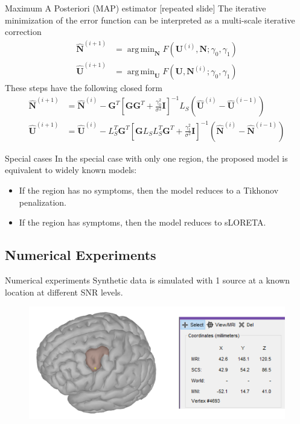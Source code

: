 \documentclass[progressbar=head]{beamer}
\newcommand{\ppar}[1]{ \left( #1 \right) }
\newcommand{\spar}[1]{ \left[ #1 \right] }
\DeclareMathOperator*{\argmin}{arg\,min}
\newcommand{\G}{\mathbf{G}}
\newcommand{\U}{\mathbf{U}}
\newcommand{\N}{\mathbf{N}}
\newcommand{\id}{\mathbf{I}}
\begin{document}
\begin{frame}{Maximum A Posteriori (MAP) estimator [repeated slide]}
    The iterative minimization of the error function can be interpreted as a multi-scale iterative correction
    \begin{align}
        \hat{\N}^{(i+1)} &= \argmin_{\N} F\ppar{\U^{(i)},\N; \gamma_0, \gamma_1}
        \\
        \hat{\U}^{(i+1)} &= \argmin_{\U} F\ppar{\U,\N^{(i)}; \gamma_0, \gamma_1}
    \end{align}
    These steps have the following closed form
    \begin{align}
        \hat{\N}^{(i+1)} &=
        \hat{\N}^{(i)}
        -
        \G^T \spar{\G \G^T + \frac{\gamma_0^2}{\sigma^2} \id}^{-1} L_S \ppar{\hat{\U}^{(i)}-\hat{\U}^{(i-1)} }
        \\
        \hat{\U}^{(i+1)} &=
        \hat{\U}^{(i)}
        -
        L_S^T \G^T \spar{\G L_S L_S^T \G^T + \frac{\gamma_1^2}{\sigma^2} \id}^{-1} \ppar{\hat{\N}^{(i)}-\hat{\N}^{(i-1)} }
    \end{align}
\end{frame}

\begin{frame}{Special cases}
In the special case with only one region, the proposed model is equivalent to widely known models:
\begin{itemize}
\item If the region has no symptoms, 
then the model reduces to a Tikhonov penalization.
\item If the region has symptoms,
then the model reduces to sLORETA.
\end{itemize}
\end{frame}


{
\subsection{Numerical Experiments}
}

\begin{frame}{Numerical experiments}
Synthetic data is simulated with 1 source at a known location at different SNR levels. 
\begin{figure}
\centering
\includegraphics[width=0.8\linewidth]{./img_oldbeamer/protocol1}
\end{figure}
\end{frame}
\end{document}
